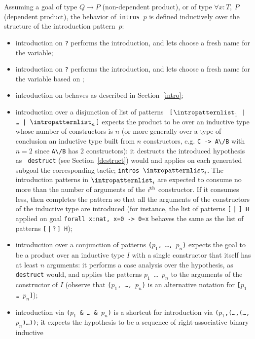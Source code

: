 \begin{coq_example*}
Assuming a goal of type $Q \to P$ (non-dependent product), or
of type $\forall x:T,~P$ (dependent product), the behavior of
{\tt intros $p$} is defined inductively over the structure of the
introduction pattern~$p$:
\begin{itemize}
\item introduction on \texttt{?} performs the introduction, and lets {\Coq}
  choose a fresh name for the variable;
\item introduction on \texttt{?\ident} performs the introduction, and
  lets {\Coq} choose a fresh name for the variable based on {\ident};
\item introduction on \texttt{\ident} behaves as described in
  Section~\ref{intro};
\item introduction over a disjunction of list of patterns {\tt
  [$\intropatternlist_{1}$ | \dots\ | $\intropatternlist_n$]} expects
  the product to be over an inductive type whose number of
  constructors is $n$ (or more generally over a type of conclusion an
  inductive type built from $n$ constructors, e.g. {\tt C ->
    A\textbackslash/B} with $n=2$ since {\tt A\textbackslash/B} has 2
  constructors): it destructs the introduced hypothesis as {\tt
    destruct} (see Section~\ref{destruct}) would and applies on each
  generated subgoal the corresponding tactic;
  \texttt{intros}~$\intropatternlist_i$. The introduction patterns in
  $\intropatternlist_i$ are expected to consume no more than the
  number of arguments of the $i^{\mbox{\scriptsize th}}$
  constructor. If it consumes less, then {\Coq} completes the pattern
  so that all the arguments of the constructors of the inductive type
  are introduced (for instance, the list of patterns {\tt [$\;$|$\;$]
    H} applied on goal {\tt forall x:nat, x=0 -> 0=x} behaves the same
  as the list of patterns {\tt [$\,$|$\,$?$\,$] H});
\item introduction over a conjunction of patterns {\tt ($p_1$, \ldots,
  $p_n$)} expects the goal to be a product over an inductive type $I$ with a
  single constructor that itself has at least $n$ arguments: it
  performs a case analysis over the hypothesis, as {\tt destruct}
  would, and applies the patterns $p_1$~\ldots~$p_n$ to the arguments
  of the constructor of $I$ (observe that {\tt ($p_1$, {\ldots},
  $p_n$)} is an alternative notation for {\tt [$p_1$ {\ldots}
  $p_n$]});
\item introduction via {\tt ($p_1$ \& \dots\ \& $p_n$)}
  is a shortcut for introduction via
  {\tt ($p_1$,(\ldots,(\dots,$p_n$)\ldots))}; it expects the
  hypothesis to be a sequence of right-associative binary inductive

\end{itemize}
\end{coq_example*}
